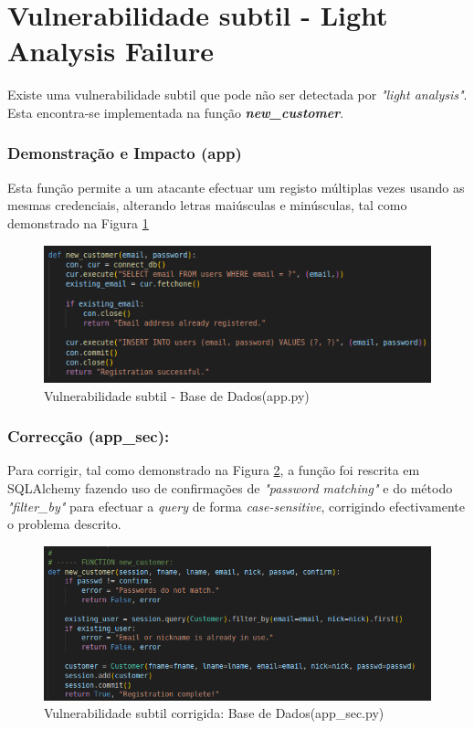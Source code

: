 \section{Vulnerabilidade subtil - Light Analysis Failure}
\label{sec.subtil}
Existe uma vulnerabilidade subtil que pode não ser detectada por \textit{"light analysis"}. Esta encontra-se implementada na função \textbf{\textit{new\_customer}}.

\subsubsection{Demonstração e Impacto (app)}
Esta função permite a um atacante efectuar um registo múltiplas vezes usando as mesmas credenciais, alterando letras maiúsculas e minúsculas, tal como demonstrado na Figura \ref{fig:subtil}

\begin{figure}[H]
  \centering
  \includegraphics[width=16cm]{images/Subtil.png}
  \caption{Vulnerabilidade subtil - Base de Dados(app.py)}
  \label{fig:subtil}
\end{figure}

\subsubsection{Correcção (app\_sec):}
Para corrigir, tal como demonstrado na Figura \ref{fig:corr-subtil}, a função foi rescrita em SQLAlchemy fazendo uso de confirmações de \textit{"password matching"} e do método \textit{"filter\_by"} para efectuar a \textit{query} de forma \textit{case-sensitive}, corrigindo efectivamente o problema descrito.

\begin{figure}[H]
  \centering
  \includegraphics[width=16cm]{images/Correcção-Subtil.png}
  \caption{Vulnerabilidade subtil corrigida: Base de Dados(app\_sec.py)}
  \label{fig:corr-subtil}
\end{figure}
%
%
%
%

